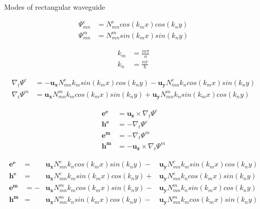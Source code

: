 \documentclass{article}
\newcommand\myvec[1]{\mathbf{#1}}
\begin{document}
Modes of rectangular waveguide

\begin{align}
   \Psi_{mn}^e &= N_{mn}^e cos(k_mx)cos(k_ny) \\
   \Psi_{mn}^m &= N_{mn}^m sin(k_mx)sin(k_ny)
\end{align}

\begin{align}
   k_m &= \frac{m\pi}{a} \\
   k_n &= \frac{n\pi}{b}
\end{align}

\begin{align}
  \nabla_t\Psi^e &= -\myvec{u_x}N_{mn}^ek_m sin(k_mx)cos(k_ny) 
                    - \myvec{u_y}N_{mn}^ek_n cos(k_mx)sin(k_ny) \\
  \nabla_t\Psi^m &= \myvec{u_x}N_{mn}^mk_m cos(k_mx)sin(k_ny) 
                    + \myvec{u_y}N_{mn}^mk_n sin(k_mx)cos(k_ny)
\end{align}

\begin{align}
  \myvec{e^e} &= \myvec{u_z} \times \nabla_t\Psi^e \\
  \myvec{h^e} &= -\nabla_t\Psi^e  \\
  \myvec{e^m} &= - \nabla_t\Psi^m \\
  \myvec{h^m} &= - \myvec{u_z} \times \nabla_t\Psi^m
\end{align}


\begin{align}
  \myvec{e^e} &= &\myvec{u_x}N_{mn}^ek_n cos(k_mx)sin(k_ny)
                -&\myvec{u_y}N_{mn}^ek_m sin(k_mx)cos(k_ny) \\
  \myvec{h^e} &= &\myvec{u_x}N_{mn}^ek_m sin(k_mx)cos(k_ny) 
                 + &\myvec{u_y}N_{mn}^ek_n cos(k_mx)sin(k_ny)\\
  \myvec{e^m} &=  -&\myvec{u_x}N_{mn}^mk_m cos(k_mx)sin(k_ny) 
                    - &\myvec{u_y}N_{mn}^mk_n sin(k_mx)cos(k_ny) \\
  \myvec{h^m} &=  &\myvec{u_x}N_{mn}^mk_n sin(k_mx)cos(k_ny) 
                    - &\myvec{u_y}N_{mn}^mk_m cos(k_mx)sin(k_ny)
\end{align}
\end{document}
